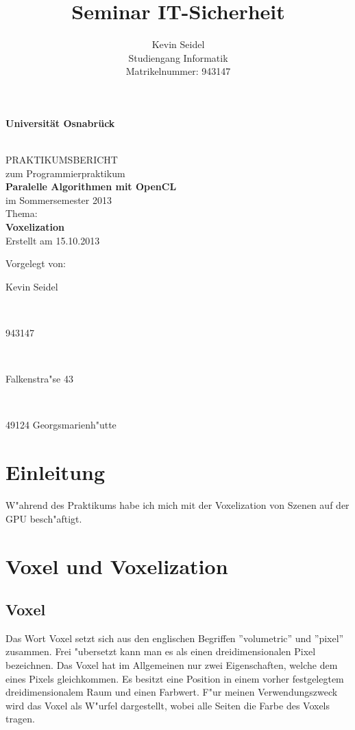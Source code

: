 \documentclass[a4paper, 12pt]{scrartcl}
\title{Seminar IT-Sicherheit}
\author{Kevin Seidel \\ Studiengang Informatik \\ Matrikelnummer: 943147}
\begin{document}
\begin{titlepage}
\begin{center}
\vspace*{1.5cm}
\begin{Large}
\textbf{Universität Osnabrück}
\end{Large}

\noindent\hrulefill
\\[3.5cm]
PRAKTIKUMSBERICHT \\[1cm]
zum Programmierpraktikum \\[1cm]
\textbf{Paralelle Algorithmen mit OpenCL} \\[1.5cm]
im Sommersemester 2013 \\[1.5cm]
Thema: \\[0.5cm]
\textbf{Voxelization} \\[2cm]
Erstellt am 15.10.2013
\end{center}
\vfill
\begin{flushleft}
Vorgelegt von: 
\hfill \parbox{46mm}{Kevin Seidel} \\
\hfill \parbox{46mm}{943147} \\
\hfill \parbox{46mm}{Falkenstra"se 43} \\
\hfill \parbox{46mm}{49124 Georgsmarienh"utte}
\end{flushleft}
\end{titlepage}

\newpage

\setcounter{page}{2}
\tableofcontents

\newpage
{}
\setcounter{page}{1}

\section{Einleitung}
W"ahrend des Praktikums habe ich mich mit der Voxelization von Szenen auf der GPU besch"aftigt. 

\section{Voxel und Voxelization}
\subsection{Voxel}
Das Wort Voxel setzt sich aus den englischen Begriffen ''volumetric'' und ''pixel'' zusammen. Frei "ubersetzt kann man es als einen dreidimensionalen Pixel bezeichnen.
Das Voxel hat im Allgemeinen nur zwei Eigenschaften, welche dem eines Pixels gleichkommen. Es besitzt eine Position in einem vorher festgelegtem dreidimensionalem Raum und einen Farbwert.
F"ur meinen Verwendungszweck wird das Voxel als W"urfel dargestellt, wobei alle Seiten die Farbe des Voxels tragen.
\end{document}
